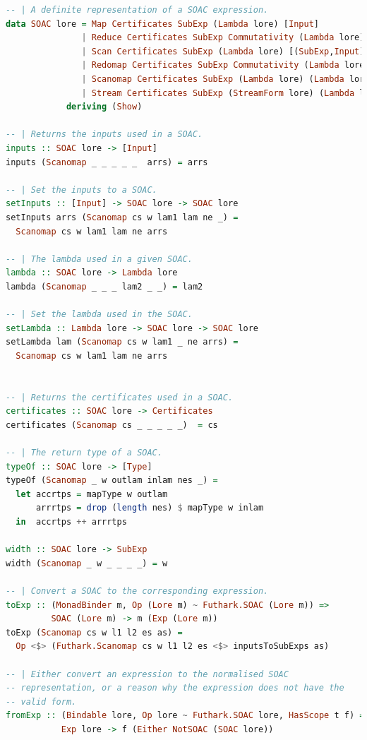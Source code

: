 \documentclass[11pt,bibliography=totocnumbered]{article}
\begin{document}
\begin{lstlisting}[language=Haskell,caption=Implementing scanomap as SOAC] 
-- | A definite representation of a SOAC expression.
data SOAC lore = Map Certificates SubExp (Lambda lore) [Input]
               | Reduce Certificates SubExp Commutativity (Lambda lore) [(SubExp,Input)]
               | Scan Certificates SubExp (Lambda lore) [(SubExp,Input)]
               | Redomap Certificates SubExp Commutativity (Lambda lore) (Lambda lore) [SubExp] [Input]
               | Scanomap Certificates SubExp (Lambda lore) (Lambda lore) [SubExp] [Input]
               | Stream Certificates SubExp (StreamForm lore) (Lambda lore) [Input]
            deriving (Show)
            
-- | Returns the inputs used in a SOAC.
inputs :: SOAC lore -> [Input]
inputs (Scanomap _ _ _ _ _  arrs) = arrs

-- | Set the inputs to a SOAC.
setInputs :: [Input] -> SOAC lore -> SOAC lore
setInputs arrs (Scanomap cs w lam1 lam ne _) =
  Scanomap cs w lam1 lam ne arrs
  
-- | The lambda used in a given SOAC.
lambda :: SOAC lore -> Lambda lore
lambda (Scanomap _ _ _ lam2 _ _) = lam2

-- | Set the lambda used in the SOAC.
setLambda :: Lambda lore -> SOAC lore -> SOAC lore
setLambda lam (Scanomap cs w lam1 _ ne arrs) =
  Scanomap cs w lam1 lam ne arrs


-- | Returns the certificates used in a SOAC.
certificates :: SOAC lore -> Certificates
certificates (Scanomap cs _ _ _ _ _)  = cs

-- | The return type of a SOAC.
typeOf :: SOAC lore -> [Type]
typeOf (Scanomap _ w outlam inlam nes _) =
  let accrtps = mapType w outlam
      arrrtps = drop (length nes) $ mapType w inlam
  in  accrtps ++ arrrtps

width :: SOAC lore -> SubExp
width (Scanomap _ w _ _ _ _) = w

-- | Convert a SOAC to the corresponding expression.
toExp :: (MonadBinder m, Op (Lore m) ~ Futhark.SOAC (Lore m)) =>
         SOAC (Lore m) -> m (Exp (Lore m))
toExp (Scanomap cs w l1 l2 es as) =
  Op <$> (Futhark.Scanomap cs w l1 l2 es <$> inputsToSubExps as)

-- | Either convert an expression to the normalised SOAC
-- representation, or a reason why the expression does not have the
-- valid form.
fromExp :: (Bindable lore, Op lore ~ Futhark.SOAC lore, HasScope t f) =>
           Exp lore -> f (Either NotSOAC (SOAC lore))


\end{lstlisting}
\end{document}
